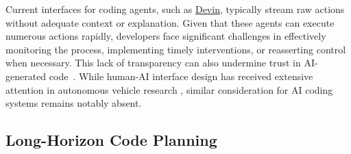 Current interfaces for coding agents, such as \href{https://devin.ai/}{Devin}, typically stream raw actions without adequate context or explanation. Given that these agents can execute numerous actions rapidly, developers face significant challenges in effectively monitoring the process, implementing timely interventions, or reasserting control when necessary.  This lack of transparency can also undermine trust in AI-generated code~\citep{10.1145/3630106.3658984}. While human-AI interface design has received extensive attention in autonomous vehicle research \citep{benderius2017best,tinga2022human}, similar consideration for AI coding systems remains notably absent.









\subsection{Long-Horizon Code Planning} \label{sec:c-long-horizon}

